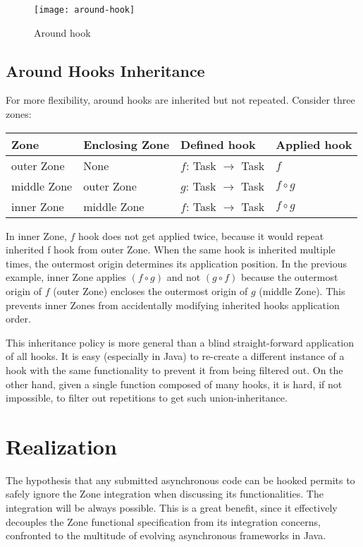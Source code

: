 \begin{figure}[h]
  \centering
  \texttt{[image: around-hook]}
  \caption{Around hook}
  \label{fig:around-hook}
\end{figure}

\subsection*{Around Hooks Inheritance}

For more flexibility, around hooks are inherited but not repeated. Consider three zones:

\begin{tabular}{|l|l|l|l|}
\hline
\textbf{Zone} & \textbf{Enclosing Zone} & \textbf{Defined hook} & \textbf{Applied hook}
\\\hline
outer Zone & None & $f$: Task $\rightarrow$ Task & $f$
\\\hline
middle Zone & outer Zone & $g$: Task $\rightarrow$ Task & $f \circ g$
\\\hline
inner Zone & middle Zone & $f$: Task $\rightarrow$ Task & $f \circ g$
\\\hline
\end{tabular}

In inner Zone, $f$ hook does not get applied twice, because it would repeat inherited f hook from outer Zone. When the same hook is inherited multiple times, the outermost origin determines its application position. In the previous example, inner Zone applies $( f \circ g )$ and not $( g \circ f )$ because the outermost origin of $f$ (outer Zone) encloses the outermost origin of $g$ (middle Zone). This prevents inner Zones from accidentally modifying inherited hooks application order.

This inheritance policy is more general than a blind straight-forward application of all hooks. It is easy (especially in Java) to re-create a different instance of a hook with the same functionality to prevent it from being filtered out. On the other hand, given a single function composed of many hooks, it is hard, if not impossible, to filter out repetitions to get such union-inheritance.

\section{Realization}
\label{sec:realization}

The hypothesis that any submitted asynchronous code can be hooked permits to safely ignore the Zone integration when discussing its functionalities. The integration will be always possible. This is a great benefit, since it effectively decouples the Zone functional specification from its integration concerns, confronted to the multitude of evolving asynchronous frameworks in Java.

